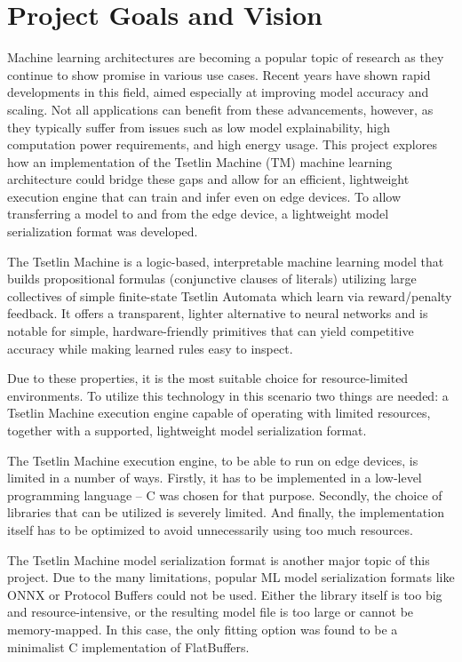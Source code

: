 \chapter{Project Goals and Vision}
\label{chap:goals-vision}

Machine learning architectures are becoming a popular topic of research as they continue to show promise in various use cases. Recent years have shown rapid developments in this field, aimed especially at improving model accuracy and scaling. Not all applications can benefit from these advancements, however, as they typically suffer from issues such as low model explainability, high computation power requirements, and high energy usage. This project explores how an implementation of the Tsetlin Machine (TM) machine learning architecture could bridge these gaps and allow for an efficient, lightweight execution engine that can train and infer even on edge devices. To allow transferring a model to and from the edge device, a lightweight model serialization format was developed.

The Tsetlin Machine is a logic-based, interpretable machine learning model that builds propositional formulas (conjunctive clauses of literals) utilizing large collectives of simple finite-state Tsetlin Automata which learn via reward/penalty feedback. It offers a transparent, lighter alternative to neural networks and is notable for simple, hardware-friendly primitives that can yield competitive accuracy while making learned rules easy to inspect.

Due to these properties, it is the most suitable choice for resource-limited environments. To utilize this technology in this scenario two things are needed: a Tsetlin Machine execution engine capable of operating with limited resources, together with a supported, lightweight model serialization format.

The Tsetlin Machine execution engine, to be able to run on edge devices, is limited in a number of ways. Firstly, it has to be implemented in a low-level programming language -- C was chosen for that purpose. Secondly, the choice of libraries that can be utilized is severely limited. And finally, the implementation itself has to be optimized to avoid unnecessarily using too much resources.

The Tsetlin Machine model serialization format is another major topic of this project. Due to the many limitations, popular ML model serialization formats like ONNX or Protocol Buffers could not be used. Either the library itself is too big and resource-intensive, or the resulting model file is too large or cannot be memory-mapped. In this case, the only fitting option was found to be a minimalist C implementation of FlatBuffers.

